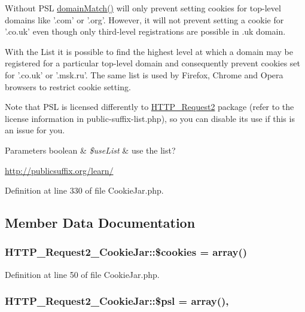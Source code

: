 Without P\-S\-L \hyperlink{classHTTP__Request2__CookieJar_ad22bee9ce6d2c111120bf44c3e302401}{domain\-Match()} will only prevent setting cookies for top-\/level domains like '.com' or '.org'. However, it will not prevent setting a cookie for '.co.\-uk' even though only third-\/level registrations are possible in .uk domain.

With the List it is possible to find the highest level at which a domain may be registered for a particular top-\/level domain and consequently prevent cookies set for '.co.\-uk' or '.msk.\-ru'. The same list is used by Firefox, Chrome and Opera browsers to restrict cookie setting.

Note that P\-S\-L is licensed differently to \hyperlink{classHTTP__Request2}{H\-T\-T\-P\-\_\-\-Request2} package (refer to the license information in public-\/suffix-\/list.\-php), so you can disable its use if this is an issue for you.


\begin{DoxyParams}[1]{Parameters}
boolean & {\em \$use\-List} & use the list?\\
\hline
\end{DoxyParams}
\hyperlink{}{http\-://publicsuffix.\-org/learn/}

Definition at line 330 of file Cookie\-Jar.\-php.



\subsection{Member Data Documentation}
\hypertarget{classHTTP__Request2__CookieJar_ab7bfdc0aa06d9b09b8050cfbdb1afacf}{
\subsubsection[{\$cookies}]{\setlength{\rightskip}{0pt plus 5cm}H\-T\-T\-P\-\_\-\-Request2\-\_\-\-Cookie\-Jar\-::\$cookies = array()\hspace{0.3cm}{\ttfamily [protected]}}}\label{classHTTP__Request2__CookieJar_ab7bfdc0aa06d9b09b8050cfbdb1afacf}


Definition at line 50 of file Cookie\-Jar.\-php.

\hypertarget{classHTTP__Request2__CookieJar_a3ff030e15c5780c2812814e8e7d3131d}{
\subsubsection[{\$psl}]{\setlength{\rightskip}{0pt plus 5cm}H\-T\-T\-P\-\_\-\-Request2\-\_\-\-Cookie\-Jar\-::\$psl = array()\hspace{0.3cm}{\ttfamily [static]}, {\ttfamily [protected]}}}\label{classHTTP__Request2__CookieJar_a3ff030e15c5780c2812814e8e7d3131d}


